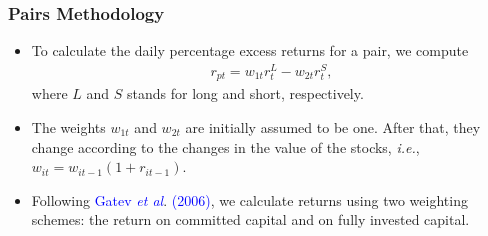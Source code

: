 \documentclass[pdf,9pt,xcolor=dvipsnames,hide notes]{beamer}
\begin{document}
\begin{frame}[label=frame3]
	\frametitle{Pairs Methodology}
	
	\begin{itemize}
		\justifying
		\item To calculate the daily percentage excess returns for a pair, we compute
		\begin{equation}
		\begin{aligned}
		r_{pt}=w_{1t}r_{t}^{L}-w_{2t}r_{t}^{S},
		\end{aligned}
		\label{eq:eq01}
		\end{equation}
		where $L$ and $S$ stands for long and short, respectively. 
		
		\vspace{0.3cm}
		
		\item The weights $w_{1t}$ and $w_{2t}$ are initially assumed to be one. After that, they change according to the changes in the value of the stocks, \emph{i.e.}, $w_{it}=w_{it-1}(1+r_{it-1})$.
		
		\vspace{0.3cm}
		
		\item Following \textcolor{blue}{Gatev \emph{et al}}. \textcolor{blue}{(2006)}, we calculate returns using two weighting schemes: the return on committed capital and on fully invested capital. 
	
	\end{itemize}
	
\end{frame}
\end{document}

